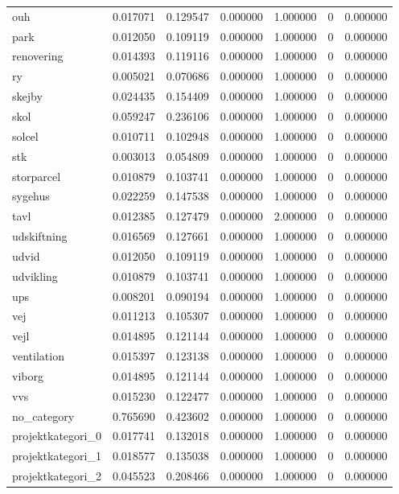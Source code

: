 \begin{landscape}
\begin{longtable}[h!]{lrrllrr}
ouh & 0.017071 & 0.129547 & 0.000000 & 1.000000 & 0 & 0.000000 \\
park & 0.012050 & 0.109119 & 0.000000 & 1.000000 & 0 & 0.000000 \\
renovering & 0.014393 & 0.119116 & 0.000000 & 1.000000 & 0 & 0.000000 \\
ry & 0.005021 & 0.070686 & 0.000000 & 1.000000 & 0 & 0.000000 \\
skejby & 0.024435 & 0.154409 & 0.000000 & 1.000000 & 0 & 0.000000 \\
skol & 0.059247 & 0.236106 & 0.000000 & 1.000000 & 0 & 0.000000 \\
solcel & 0.010711 & 0.102948 & 0.000000 & 1.000000 & 0 & 0.000000 \\
stk & 0.003013 & 0.054809 & 0.000000 & 1.000000 & 0 & 0.000000 \\
storparcel & 0.010879 & 0.103741 & 0.000000 & 1.000000 & 0 & 0.000000 \\
sygehus & 0.022259 & 0.147538 & 0.000000 & 1.000000 & 0 & 0.000000 \\
tavl & 0.012385 & 0.127479 & 0.000000 & 2.000000 & 0 & 0.000000 \\
udskiftning & 0.016569 & 0.127661 & 0.000000 & 1.000000 & 0 & 0.000000 \\
udvid & 0.012050 & 0.109119 & 0.000000 & 1.000000 & 0 & 0.000000 \\
udvikling & 0.010879 & 0.103741 & 0.000000 & 1.000000 & 0 & 0.000000 \\
ups & 0.008201 & 0.090194 & 0.000000 & 1.000000 & 0 & 0.000000 \\
vej & 0.011213 & 0.105307 & 0.000000 & 1.000000 & 0 & 0.000000 \\
vejl & 0.014895 & 0.121144 & 0.000000 & 1.000000 & 0 & 0.000000 \\
ventilation & 0.015397 & 0.123138 & 0.000000 & 1.000000 & 0 & 0.000000 \\
viborg & 0.014895 & 0.121144 & 0.000000 & 1.000000 & 0 & 0.000000 \\
vvs & 0.015230 & 0.122477 & 0.000000 & 1.000000 & 0 & 0.000000 \\
no_category & 0.765690 & 0.423602 & 0.000000 & 1.000000 & 0 & 0.000000 \\
projektkategori_0 & 0.017741 & 0.132018 & 0.000000 & 1.000000 & 0 & 0.000000 \\
projektkategori_1 & 0.018577 & 0.135038 & 0.000000 & 1.000000 & 0 & 0.000000 \\
projektkategori_2 & 0.045523 & 0.208466 & 0.000000 & 1.000000 & 0 & 0.000000 \\

\end{longtable}
\end{landscape}
